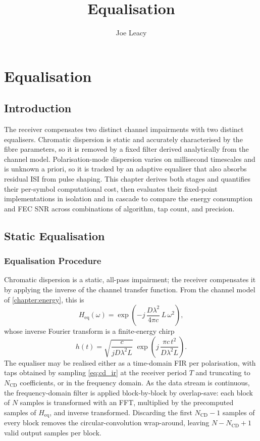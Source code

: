 \documentclass[12pt,a4paper]{article}
\title{Equalisation}
\author{Joe Leacy}
\begin{document}
\maketitle

\chapter{Equalisation}\label{chapter:equalisation}

\section{Introduction}
The receiver compensates two distinct channel impairments with two distinct equalisers. Chromatic dispersion is static and accurately characterised by the fibre parameters, so it is removed by a fixed filter derived analytically from the channel model. Polarisation-mode dispersion varies on millisecond timescales and is unknown a priori, so it is tracked by an adaptive equaliser that also absorbs residual ISI from pulse shaping. This chapter derives both stages and quantifies their per-symbol computational cost, then evaluates their fixed-point implementations in isolation and in cascade to compare the energy consumption and FEC SNR across combinations of algorithm, tap count, and precision.

\section{Static Equalisation}
\subsection{Equalisation Procedure}
Chromatic dispersion is a static, all-pass impairment; the receiver compensates it by applying the inverse of the channel transfer function. From the channel model of \cref{chapter:energy}, this is
\begin{equation}
    H_\mathrm{eq}(\omega) = \exp\!\left(-j\,\frac{D\lambda^2}{4\pi c}\,L\,\omega^2\right),
    \label{eq:cd_tf}
\end{equation}
whose inverse Fourier transform is a finite-energy chirp
\begin{equation}
    h(t) = \sqrt{\frac{c}{j D \lambda^2 L}}\;\exp\!\left(j\,\frac{\pi c\,t^2}{D\lambda^2 L}\right).
    \label{eq:cd_ir}
\end{equation}
The equaliser may be realised either as a time-domain FIR per polarisation, with taps obtained by sampling \cref{eq:cd_ir} at the receiver period \(T\) and truncating to \(N_\mathrm{CD}\) coefficients, or in the frequency domain. As the data stream is continuous, the frequency-domain filter is applied block-by-block by overlap-save: each block of \(N\) samples is transformed with an FFT, multiplied by the precomputed samples of \(H_\mathrm{eq}\), and inverse transformed. Discarding the first \(N_\mathrm{CD}-1\) samples of every block removes the circular-convolution wrap-around, leaving \(N - N_\mathrm{CD} + 1\) valid output samples per block.
\end{document}
